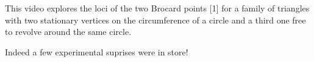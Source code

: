 This video explores the loci of the two Brocard points [1] for a family of triangles with two stationary vertices on the circumference of a circle and a third one free to revolve around the same circle.

Indeed a few experimental suprises were in store!
